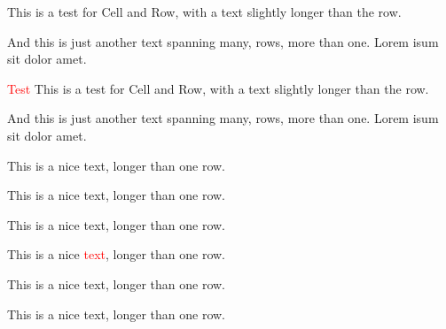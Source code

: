 \documentclass{scrartcl}
\begin{document}
%
\begin{Row}%
\begin{Cell}{2}
This is a test for Cell and Row, with a text slightly longer than the row.
\end{Cell}
\begin{Cell}{1}
And this is just another text spanning many, rows, more than one. Lorem isum sit dolor amet.
\end{Cell}
\end{Row}

\bigskip

\begin{Row}%
\begin{Cell}{2}
\textcolor{red}{Test}
This is a test for Cell and Row, with a text slightly longer than the row.
\end{Cell}%
\begin{Cell}{1}
And this is just another text spanning many, rows, more than one. Lorem isum sit dolor amet.
\end{Cell}%
\end{Row}

\bigskip

\begin{row}[cellsep=0.5cm]{3}{3}%
\begin{cell}{1}
This is a nice text, longer than one row.
\end{cell}
\begin{cell}{1}
This is a nice text, longer than one row.
\end{cell}
\begin{cell}{1}
This is a nice text, longer than one row.
\end{cell}
\end{row}

\begin{row}[cellsep=0.5cm]{3}{3}%
\begin{cell}{1}
This is a nice \textcolor{red}{text}, longer than one row.
\end{cell}
\begin{cell}{1}
This is a nice text, longer than one row.
\end{cell}
\begin{cell}{1}
This is a nice text, longer than one row.
\end{cell}
\end{row}

\bigskip

\end{document}
